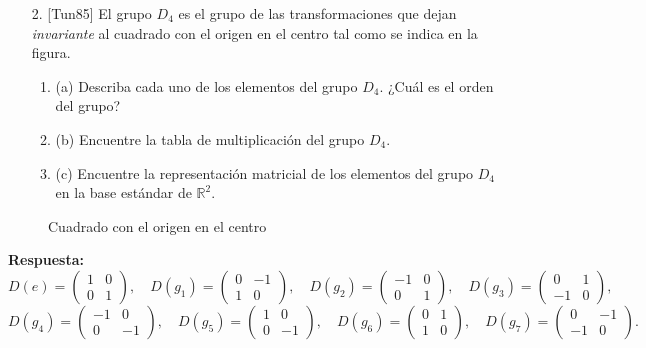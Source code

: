 \documentclass[a4paper,12pt]{article}
\begin{document}
\begin{enumerate}
    \item [2.] [Tun85] El grupo $D_4$ es el grupo de las transformaciones que dejan \textit{invariante} al cuadrado con el origen en el centro tal como se indica en la figura.
    \begin{enumerate}
        \item (a) Describa cada uno de los elementos del grupo $D_4$. ¿Cuál es el orden del grupo?
        \item (b) Encuentre la tabla de multiplicación del grupo $D_4$.
        \item (c) Encuentre la representación matricial de los elementos del grupo $D_4$ en la base estándar de $\mathbb{R}^2$.
    \end{enumerate}
\end{enumerate}

\begin{figure}[h]
    \centering
    \caption{Cuadrado con el origen en el centro}
\end{figure}

\textbf{Respuesta:}
$$
D(e) = \begin{pmatrix} 1 & 0 \\ 0 & 1 \end{pmatrix}, \quad D(g_1) = \begin{pmatrix} 0 & -1 \\ 1 & 0 \end{pmatrix}, \quad D(g_2) = \begin{pmatrix} -1 & 0 \\ 0 & 1 \end{pmatrix}, \quad D(g_3) = \begin{pmatrix} 0 & 1 \\ -1 & 0 \end{pmatrix},
$$
$$
D(g_4) = \begin{pmatrix} -1 & 0 \\ 0 & -1 \end{pmatrix}, \quad D(g_5) = \begin{pmatrix} 1 & 0 \\ 0 & -1 \end{pmatrix}, \quad D(g_6) = \begin{pmatrix} 0 & 1 \\ 1 & 0 \end{pmatrix}, \quad D(g_7) = \begin{pmatrix} 0 & -1 \\ -1 & 0 \end{pmatrix}.
$$
\end{document}
